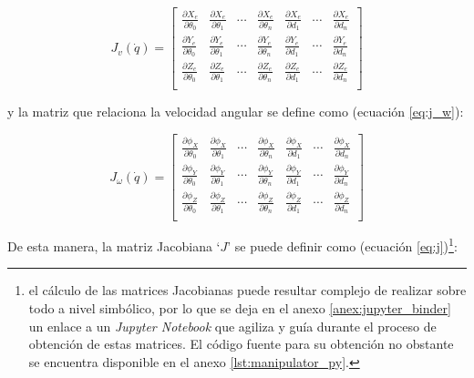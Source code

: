 \begin{equation}\label{eq:j_v}
    J_v\left(\dot{q}\right) = 
    \begin{bmatrix}
        \frac{\partial X_e}{\partial \theta_0} & \frac{\partial X_e}{\partial \theta_1} & \cdots & \frac{\partial X_e}{\partial \theta_n} & \frac{\partial X_e}{\partial d_1} & \cdots & \frac{\partial X_e}{\partial d_n} \\[3ex]
        \frac{\partial Y_e}{\partial \theta_0} & \frac{\partial Y_e}{\partial \theta_1} & \cdots & \frac{\partial Y_e}{\partial \theta_n} & \frac{\partial Y_e}{\partial d_1} & \cdots & \frac{\partial Y_e}{\partial d_n} \\[3ex]
        \frac{\partial Z_e}{\partial \theta_0} & \frac{\partial Z_e}{\partial \theta_1} & \cdots & \frac{\partial Z_e}{\partial \theta_n} & \frac{\partial Z_e}{\partial d_1} & \cdots & \frac{\partial Z_e}{\partial d_n} \\
    \end{bmatrix}
\end{equation}

y la matriz que relaciona la velocidad angular se define como (ecuación \ref{eq:j_w}):

\begin{equation}\label{eq:j_w}
    J_{\omega}\left(\dot{q}\right) =
    \begin{bmatrix}
        \frac{\partial \phi_X}{\partial \theta_0} & \frac{\partial \phi_X}{\partial \theta_1} & \cdots & \frac{\partial \phi_X}{\partial \theta_n} & \frac{\partial \phi_X}{\partial d_1} & \cdots & \frac{\partial \phi_X}{\partial d_n} \\[3ex]
        \frac{\partial \phi_Y}{\partial \theta_0} & \frac{\partial \phi_Y}{\partial \theta_1} & \cdots & \frac{\partial \phi_Y}{\partial \theta_n} & \frac{\partial \phi_Y}{\partial d_1} & \cdots & \frac{\partial \phi_Y}{\partial d_n} \\[3ex]
        \frac{\partial \phi_Z}{\partial \theta_0} & \frac{\partial \phi_Z}{\partial \theta_1} & \cdots & \frac{\partial \phi_Z}{\partial \theta_n} & \frac{\partial \phi_Z}{\partial d_1} & \cdots & \frac{\partial \phi_Z}{\partial d_n} \\
    \end{bmatrix}
\end{equation}

De esta manera, la matriz Jacobiana `$J$' se puede definir como 
(ecuación \ref{eq:j})\footnote{el cálculo de las matrices Jacobianas puede resultar
complejo de realizar sobre todo a nivel simbólico, por lo que se deja en el anexo
\ref{anex:jupyter_binder} un enlace a un \textit{Jupyter Notebook} que agiliza y guía
durante el proceso de obtención de estas matrices. El código fuente para su obtención
no obstante se encuentra disponible en el anexo \ref{lst:manipulator_py}.}:

